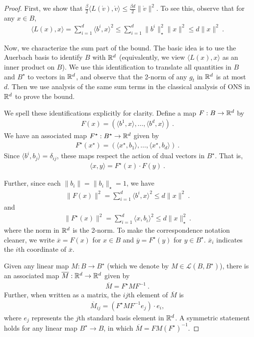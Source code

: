\documentclass[12pt]{colt2018} %
\renewcommand{\v}{\mathring{v}}
\begin{document}
\begin{proof}
First, we show that $\frac{\beta}{2}\langle L(\v),\v\rangle \le \frac{\beta d}{2} \|\v\|^2$. To see this, observe that for any $x\in B$,
\begin{align*}
\langle L(x), x\rangle=\sum_{i=1}^d\langle b^i,x\rangle^2\le \sum_{i=1}^d\|b^i\|_\star^2\|x\|^2\le d\|x\|^2~.
\end{align*}

Now, we characterize the sum part of the bound. The basic idea is to use the Auerbach basis to identify $B$ with $\mathbb{R}^d$ (equivalently, we view $\langle L(x),x\rangle$ as an inner product on $B$). We use this identification to translate all quantities in $B$ and $B^\star$ to vectors in $\mathbb{R}^d$, and observe that the 2-norm of any $g_t$ in $\mathbb{R}^d$ is at most $d$. Then we use analysis of the same sum terms in the classical analysis of ONS in $\mathbb{R}^d$ \citep{hazan2007logarithmic} to prove the bound.

We spell these identifications explicitly for clarity. Define a map $F:B\to \mathbb{R}^d$ by
\begin{align*}
F(x)=(\langle b^1,x\rangle,\dots,\langle b^d, x\rangle)~.
\end{align*}
We have an associated map $F^\star:B^\star\to \mathbb{R}^d$ given by
\begin{align*}
F^\star(x^\star) = (\langle x^\star,b_1\rangle,\dots,\langle x^\star,b_d\rangle)~.
\end{align*}
Since $\langle b^i,b_j\rangle = \delta_{ij}$, these maps respect the action of dual vectors in $B^\star$. That is,
\begin{align*}
\langle x, y\rangle = F^\star(x)\cdot F(y)~.
\end{align*}

Further, since each $\|b_i\|=\|b_i\|_\star=1$, we have 
\begin{align*}
\|F(x)\|^2=\sum_{i=1}^d \langle b^i,x\rangle^2\le d\|x\|^2~.
\end{align*}
and 
\begin{align*}
\|F^\star (x)\|^2=\sum_{i=1}^d \langle x,b_i\rangle^2\le d\|x\|_\star^2~.
\end{align*}
where the norm in $\mathbb{R}^d$ is the 2-norm. To make the correspondence notation cleaner, we write $\overline{x} = F(x)$ for $x\in B$ and $\overline{y} = F^\star(y)$ for $y\in B^\star$. $\overline{x}_i$ indicates the $i$th coordinate of $\overline{x}$.

Given any linear map $M:B\to B^\star$ (which we denote by $M\in \mathcal{L}(B,B^\star)$), there is an associated map $\overline{M}:\mathbb{R}^d\to\mathbb{R}^d$ given by
\begin{align*}
\overline{M} = F^\star M F^{-1}~.
\end{align*}
Further, when written as a matrix, the $ij$th element of $\overline{M}$ is
\begin{align*}
\overline{M}_{ij} = (F^\star MF^{-1} e_j)\cdot e_i,
\end{align*}
where $e_j$ represents the $j$th standard basis element in $\mathbb{R}^d$. A symmetric statement holds for any linear map $B^\star\to B$, in which $\overline{M}=F M (F^\star)^{-1}$.


\end{proof}
\end{document}
